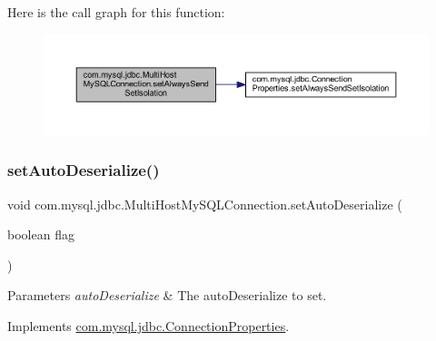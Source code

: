 Here is the call graph for this function\+:
\nopagebreak
\begin{figure}[H]
\begin{center}
\leavevmode
\includegraphics[width=350pt]{classcom_1_1mysql_1_1jdbc_1_1_multi_host_my_s_q_l_connection_af0ef05e04bfe22b5ac3e8108ea2bc3cc_cgraph}
\end{center}
\end{figure}
\mbox{\label{classcom_1_1mysql_1_1jdbc_1_1_multi_host_my_s_q_l_connection_a893d57a444b9a9bb7791efc34450b259}} 
\subsubsection{\texorpdfstring{set\+Auto\+Deserialize()}{setAutoDeserialize()}}
{\footnotesize\ttfamily void com.\+mysql.\+jdbc.\+Multi\+Host\+My\+S\+Q\+L\+Connection.\+set\+Auto\+Deserialize (\begin{DoxyParamCaption}\item[{boolean}]{flag }\end{DoxyParamCaption})}


\begin{DoxyParams}{Parameters}
{\em auto\+Deserialize} & The auto\+Deserialize to set. \\
\hline
\end{DoxyParams}


Implements \mbox{\hyperlink{interfacecom_1_1mysql_1_1jdbc_1_1_connection_properties_ac22dc46adecba26efb43a6fdc239e292}{com.\+mysql.\+jdbc.\+Connection\+Properties}}.

